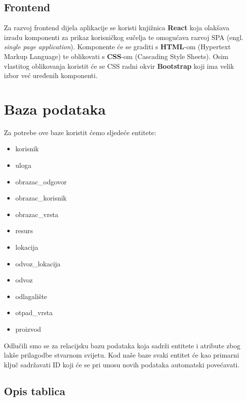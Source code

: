		
	\subsection{Frontend}
		Za razvoj frontend dijela aplikacije se koristi knjižnica \textbf{React} koja olakšava izradu komponenti za prikaz korisničkog sučelja te omogućava razvoj SPA (engl. \textit{single page application}). Komponente će se graditi s \textbf{HTML}-om (Hypertext Markup Language) te oblikovati s \textbf{CSS}-om (Cascading Style Sheets). Osim vlastitog oblikovanja koristit će se CSS radni okvir \textbf{Bootstrap} koji ima velik izbor već uređenih komponenti.
		

		

	\newpage	
		\section{Baza podataka}
			
			
		Za potrebe ove baze koristit ćemo sljedeće entitete:
			\begin{itemize}
				\item korisnik
				\item uloga
				\item obrazac\_odgovor
				\item obrazac\_korisnik
				\item obrazac\_vrsta
				\item resurs
				\item lokacija
				\item odvoz\_lokacija
				\item odvoz
				\item odlagalište
				\item otpad\_vrsta
				\item proizvod
			\end{itemize}
		Odlučili smo se za relacijsku bazu podataka koja sadrži entitete i atribute zbog lakše prilagodbe stvarnom svijetu. Kod naše baze svaki entitet će kao primarni ključ sadržavati ID koji će se pri unosu novih podataka automatski povećavati.
		
			\subsection{Opis tablica}
			
